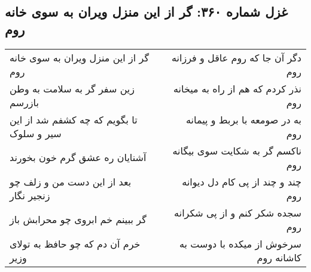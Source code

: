 \begin{center}
\section*{غزل شماره ۳۶۰: گر از این منزل ویران به سوی خانه روم}
\label{sec:sh360}
\begin{longtable}{l p{0.5cm} r}
گر از این منزل ویران به سوی خانه روم
&&
دگر آن جا که روم عاقل و فرزانه روم
\\
زین سفر گر به سلامت به وطن بازرسم
&&
نذر کردم که هم از راه به میخانه روم
\\
تا بگویم که چه کشفم شد از این سیر و سلوک
&&
به در صومعه با بربط و پیمانه روم
\\
آشنایان ره عشق گرم خون بخورند
&&
ناکسم گر به شکایت سوی بیگانه روم
\\
بعد از این دست من و زلف چو زنجیر نگار
&&
چند و چند از پی کام دل دیوانه روم
\\
گر ببینم خم ابروی چو محرابش باز
&&
سجده شکر کنم و از پی شکرانه روم
\\
خرم آن دم که چو حافظ به تولای وزیر
&&
سرخوش از میکده با دوست به کاشانه روم
\\
\end{longtable}
\end{center}
